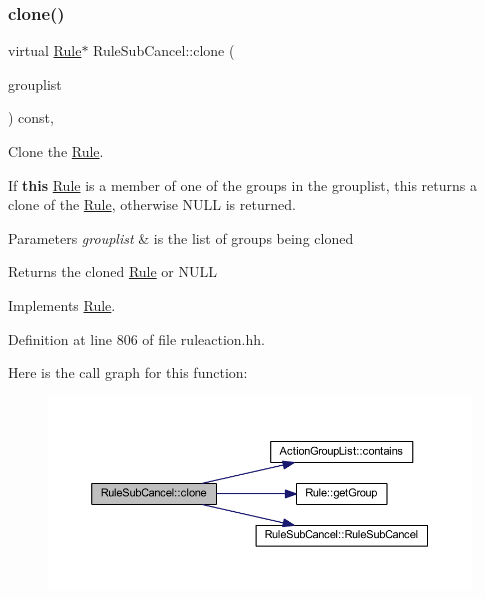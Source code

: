 \subsubsection{\texorpdfstring{clone()}{clone()}}
{\footnotesize\ttfamily virtual \mbox{\hyperlink{class_rule}{Rule}}$\ast$ Rule\+Sub\+Cancel\+::clone (\begin{DoxyParamCaption}\item[{const \mbox{\hyperlink{class_action_group_list}{Action\+Group\+List}} \&}]{grouplist }\end{DoxyParamCaption}) const\hspace{0.3cm}{\ttfamily [inline]}, {\ttfamily [virtual]}}



Clone the \mbox{\hyperlink{class_rule}{Rule}}. 

If {\bfseries{this}} \mbox{\hyperlink{class_rule}{Rule}} is a member of one of the groups in the grouplist, this returns a clone of the \mbox{\hyperlink{class_rule}{Rule}}, otherwise N\+U\+LL is returned. 
\begin{DoxyParams}{Parameters}
{\em grouplist} & is the list of groups being cloned \\
\hline
\end{DoxyParams}
\begin{DoxyReturn}{Returns}
the cloned \mbox{\hyperlink{class_rule}{Rule}} or N\+U\+LL 
\end{DoxyReturn}


Implements \mbox{\hyperlink{class_rule_a70de90a76461bfa7ea0b575ce3c11e4d}{Rule}}.



Definition at line 806 of file ruleaction.\+hh.

Here is the call graph for this function\+:
\nopagebreak
\begin{figure}[H]
\begin{center}
\leavevmode
\includegraphics[width=350pt]{class_rule_sub_cancel_adbb51485c127c76269041401f7d0494e_cgraph}
\end{center}
\end{figure}
\mbox{\label{class_rule_sub_cancel_adaf85cfc886a338f822f794788f54bfe}} 

